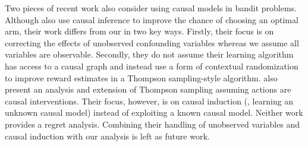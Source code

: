 
Two pieces of recent work also consider using causal models in bandit problems.
Although \citet{Bareinboim2015} also use causal inference to improve the chance of choosing an optimal arm, their work differs from our in two key ways. Firstly, their focus is on correcting the effects of unobserved confounding variables whereas we assume all variables are observable. Secondly, they do not assume their learning algorithm has access to a causal graph and instead use a form of contextual randomization to improve reward estimates in a Thompson sampling-style algorithm. \citet{Ortega2014thompson} also present an analysis and extension of Thompson sampling assuming actions are causal interventions. Their focus, however, is on causal induction (\ie, learning an unknown causal model) instead of exploiting a known causal model. Neither work provides a regret analysis. 
Combining their handling of unobserved variables and causal induction with our analysis is left as future work.


